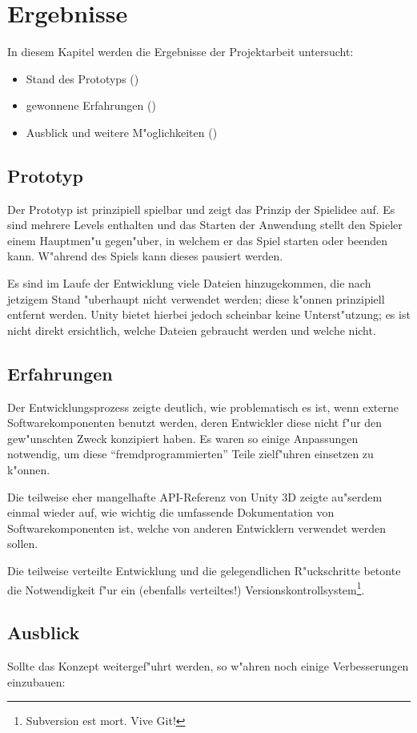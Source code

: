 \section{Ergebnisse}
\label{sec:results}
%
In diesem Kapitel werden die Ergebnisse der Projektarbeit untersucht:
\begin{itemize}
	\item
		Stand des Prototyps ()
	\item
		gewonnene Erfahrungen ()
	\item
		Ausblick und weitere M"oglichkeiten ()
\end{itemize}
%
\subsection{Prototyp}
\label{sec:results/prototype}
%
Der Prototyp ist prinzipiell spielbar und zeigt das Prinzip der
Spielidee auf. Es sind mehrere Levels enthalten und das Starten
der Anwendung stellt den Spieler einem Hauptmen"u gegen"uber, in
welchem er das Spiel starten oder beenden kann. W"ahrend des Spiels
kann dieses pausiert werden.

Es sind im Laufe der Entwicklung viele Dateien hinzugekommen, die
nach jetzigem Stand "uberhaupt nicht verwendet werden; diese k"onnen
prinzipiell entfernt werden. Unity bietet hierbei jedoch scheinbar
keine Unterst"utzung; es ist nicht direkt ersichtlich, welche
Dateien gebraucht werden und welche nicht.
%
\subsection{Erfahrungen}
\label{sec:results/xp}
%
Der Entwicklungsprozess zeigte deutlich, wie problematisch es
ist, wenn externe Softwarekomponenten benutzt werden, deren
Entwickler diese nicht f"ur den gew"unschten Zweck konzipiert haben.
Es waren so einige Anpassungen notwendig, um diese
``fremdprogrammierten'' Teile zielf"uhren einsetzen zu k"onnen.

Die teilweise eher mangelhafte API-Referenz von Unity 3D zeigte
au"serdem einmal wieder auf, wie wichtig die umfassende Dokumentation
von Softwarekomponenten ist, welche von anderen Entwicklern
verwendet werden sollen.

Die teilweise verteilte Entwicklung und die gelegendlichen R"uckschritte
betonte die Notwendigkeit f"ur ein (ebenfalls verteiltes!)
Versionskontrollsystem\footnote{Subversion est mort. Vive Git!}.
%
\subsection{Ausblick}
\label{sec:results/future}
%
Sollte das Konzept weitergef"uhrt werden, so w"ahren noch einige
Verbesserungen einzubauen:

